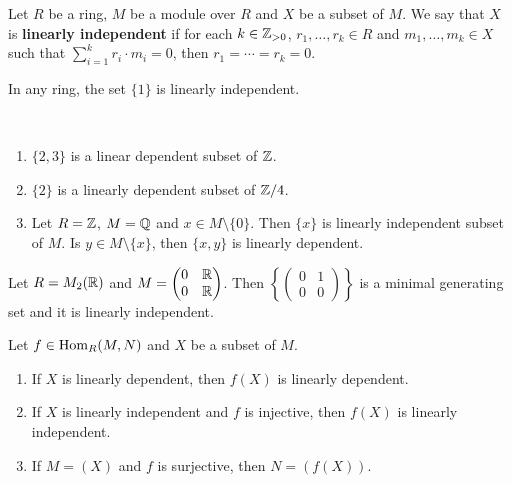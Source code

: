 
\begin{definition}
    Let $R$ be a ring, $M$ be a module over $R$ and $X$ be a subset of $M$. We say that
    $X$ is \textbf{linearly independent} if for each $k\in\mathbb{Z}_{>0}$, $r_1,\dots,r_k\in R$
    and $m_1,\dots,m_k\in X$ such that $\sum_{i=1}^kr_i\cdot m_i=0$, then 
    $r_1=\cdots=r_k=0$. 
\end{definition}

In any ring, the set $\{1\}$ is linearly independent. 

\begin{examples}\
\begin{enumerate}
    \item $\{2,3\}$ is a linear dependent subset of $\mathbb{Z}$.
    \item $\{2\}$ is a linearly dependent subset of $\mathbb{Z}/4$.
    \item Let $R=\mathbb{Z}$, $M=\mathbb{Q}$ and $x\in M\setminus\{0\}$. 
        Then $\{x\}$ is linearly independent subset of $M$. Is $y\in M\setminus\{x\}$, then
        $\{x,y\}$ is linearly dependent.  
\end{enumerate}    
\end{examples}

\begin{examples}
Let $R=M_2(\mathbb{R})$ and $M=\begin{pmatrix}
        0&\mathbb{R}\\
        0&\mathbb{R} 
    \end{pmatrix}$. Then $\left\{\begin{pmatrix}0&1\\0&0\end{pmatrix}\right\}$ is a minimal generating 
    set and it is linearly independent. 
\end{examples}

\begin{exercise}
\label{xca:LI}
    Let $f\in\operatorname{Hom}_R(M,N)$ and $X$ be a subset of $M$. 
    \begin{enumerate}
        \item If $X$ is linearly dependent, then $f(X)$ is linearly dependent.
        \item If $X$ is linearly independent and $f$ is injective, then $f(X)$ is linearly independent. 
        \item If $M=(X)$ and $f$ is surjective, then $N=(f(X))$. 
    \end{enumerate}
\end{exercise}

